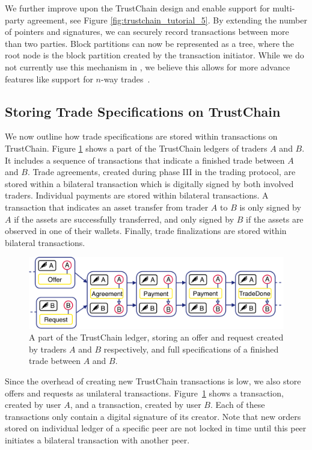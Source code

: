 We further improve upon the TrustChain design and enable support for multi-party agreement, see Figure \ref{fig:trustchain_tutorial_5}.
By extending the number of pointers and signatures, we can securely record transactions between more than two parties.
Block partitions can now be represented as a tree, where the root node is the block partition created by the transaction initiator.
While we do not currently use this mechanism in \ModelName{}, we believe this allows for more advance features like support for $n$-way trades~\cite{wang2018loopring}.

\subsection{Storing Trade Specifications on TrustChain}
We now outline how trade specifications are stored within transactions on TrustChain.
Figure \ref{fig:trustchain_market} shows a part of the TrustChain ledgers of traders $ A $ and $ B $.
It includes a sequence of transactions that indicate a finished trade between $ A $ and $ B $.
Trade agreements, created during phase III in the \ModelName{} trading protocol, are stored within a bilateral \TRAgreement{} transaction which is digitally signed by both involved traders.
Individual payments are stored within bilateral \TRPayment{} transactions.
A \TRPayment{} transaction that indicates an asset transfer from trader $ A $ to $ B $ is only signed by $ A $ if the assets are successfully transferred, and only signed by $ B $ if the assets are observed in one of their wallets.
Finally, trade finalizations are stored within bilateral \TRTradeDone{} transactions.

\begin{figure}[t]
	\centering
	\includegraphics[width=\linewidth]{xchange/assets/trustchain_market}
	\caption{A part of the TrustChain ledger, storing an offer and request created by traders $ A $ and $ B $ respectively, and full specifications of a finished trade between $ A $ and $ B $.}
	\label{fig:trustchain_market}
\end{figure}

Since the overhead of creating new TrustChain transactions is low, we also store offers and requests as unilateral transactions.
Figure~\ref{fig:trustchain_market} shows a \TROffer{} transaction, created by user $ A $, and a \TRRequest{} transaction, created by user $ B $.
Each of these transactions only contain a digital signature of its creator.
Note that new orders stored on individual ledger of a specific peer are not locked in time until this peer initiates a bilateral transaction with another peer.




